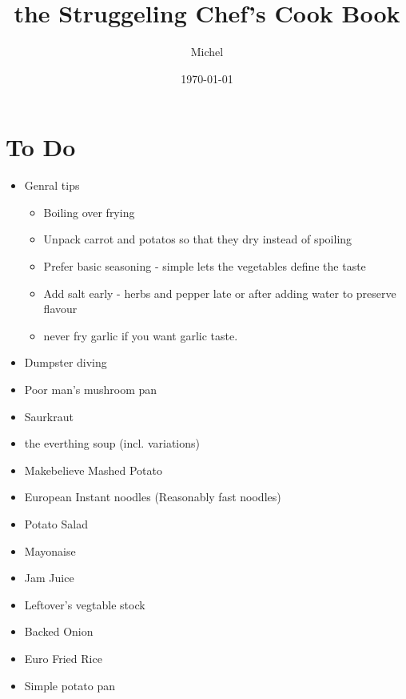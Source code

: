 \documentclass[10pt]{book}
\title{\sc the Struggeling Chef's Cook Book}
\author{Michel}
\date{\today}
\begin{document}
\maketitle

\tableofcontents

\section{To Do}{
  \begin{itemize}
    \item Genral tips
      \begin{itemize}
        \item Boiling over frying
        \item Unpack carrot and potatos so that they dry instead of spoiling
        \item Prefer basic seasoning - simple lets the vegetables
          define the taste
        \item Add salt early - herbs and pepper late or after adding
          water to preserve flavour
        \item never fry garlic if you want garlic taste.
      \end{itemize}
    \item Dumpster diving
    \item Poor man's mushroom pan
    \item Saurkraut
    \item the everthing soup (incl. variations)
    \item Makebelieve Mashed Potato
    \item European Instant noodles (Reasonably fast noodles)
    \item Potato Salad
    \item Mayonaise
    \item Jam Juice
    \item Leftover's vegtable stock
    \item Backed Onion
    \item Euro Fried Rice
    \item Simple potato pan
  \end{itemize}

}
\end{document}
